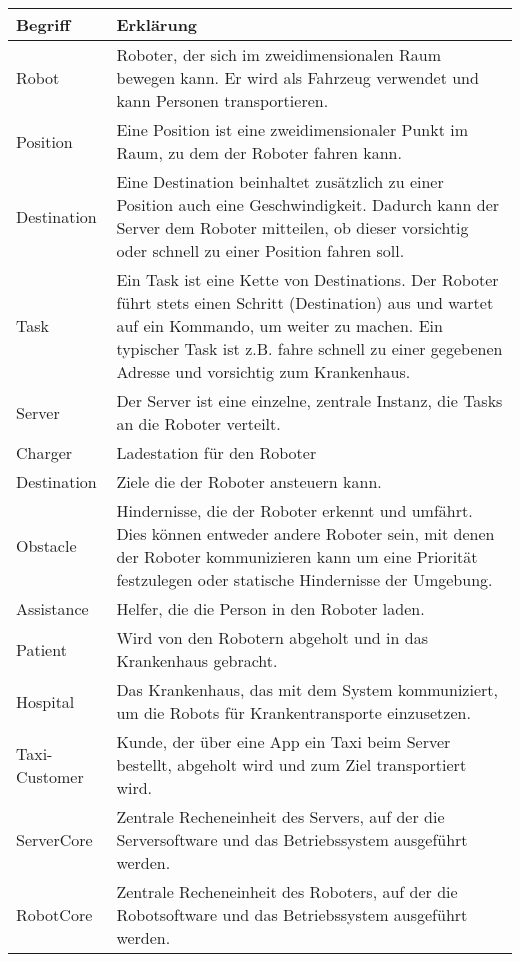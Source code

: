 	\begin{tabularx}{\textwidth}{|l|X|}
		\hline
		\textbf{Begriff} & \textbf{Erklärung}\\ \hline
		Robot & Roboter, der sich im zweidimensionalen Raum bewegen kann. Er wird als Fahrzeug verwendet und kann Personen transportieren.\\ \hline
		Position & Eine Position ist eine zweidimensionaler Punkt im Raum, zu dem der Roboter fahren kann.\\ \hline
		Destination & Eine Destination beinhaltet zusätzlich zu einer Position auch eine Geschwindigkeit. Dadurch kann der Server dem Roboter mitteilen, ob dieser vorsichtig oder schnell zu einer Position fahren soll. \\ \hline
		Task & Ein Task ist eine Kette von Destinations. Der Roboter führt stets einen Schritt (Destination) aus und wartet auf ein Kommando, um weiter zu machen. Ein typischer Task ist z.B. fahre schnell zu einer gegebenen Adresse und vorsichtig zum Krankenhaus.\\ \hline
		Server & Der Server ist eine einzelne, zentrale Instanz, die Tasks an die Roboter verteilt.\\ \hline
		Charger & Ladestation für den Roboter\\ \hline
		Destination & Ziele die der Roboter ansteuern kann.\\ \hline
		Obstacle & Hindernisse, die der Roboter erkennt und umfährt. Dies können
		entweder andere Roboter sein, mit denen der Roboter kommunizieren kann
		um eine Priorität festzulegen oder statische Hindernisse der
		Umgebung.\\ \hline
		Assistance & Helfer, die die Person in den Roboter laden.\\ \hline
		Patient & Wird von den Robotern abgeholt und in das Krankenhaus gebracht.\\ \hline
		Hospital & Das Krankenhaus, das mit dem System kommuniziert, um die Robots für Krankentransporte einzusetzen. \\ \hline
		Taxi-Customer & Kunde, der über eine App ein Taxi beim Server bestellt, abgeholt wird und zum Ziel transportiert wird.\\ \hline
		ServerCore & Zentrale Recheneinheit des Servers, auf der die Serversoftware und das Betriebssystem ausgeführt werden.\\ \hline
		RobotCore & Zentrale Recheneinheit des Roboters, auf der die Robotsoftware und das Betriebssystem ausgeführt werden.\\ \hline
	\end{tabularx}
